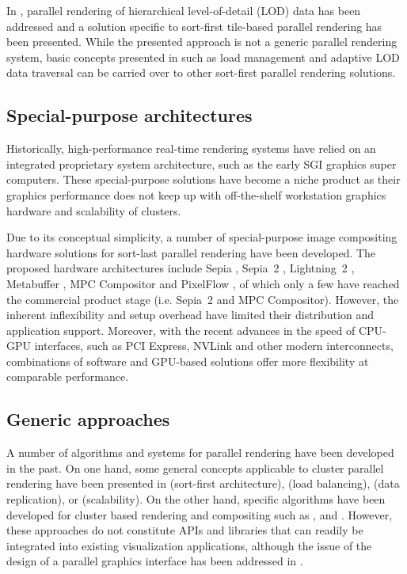 In \cite{NC:07}, parallel rendering of hierarchical level-of-detail (LOD) data
has been addressed and a solution specific to sort-first tile-based parallel
rendering has been presented. While the presented approach is not a generic
parallel rendering system, basic concepts presented in \cite{NC:07} such as load
management and adaptive LOD data traversal can be carried over to other
sort-first parallel rendering solutions.

\subsection{Special-purpose architectures}

Historically, high-performance real-time rendering systems have relied on an
integrated proprietary system architecture, such as the early SGI graphics super
computers. These special-purpose solutions have become a niche product as their
graphics performance does not keep up with off-the-shelf workstation graphics
hardware and scalability of clusters.

Due to its conceptual simplicity, a number of special-purpose image compositing
hardware solutions for sort-last parallel rendering have been developed. The
proposed hardware architectures include Sepia \cite {MHS:99a,sepia}, Sepia~2
\cite{LMSBHa:01,LMSBH:01}, Lightning~2 \cite{Stoll01}, Metabuffer
\cite{Blanke00,Zhang01}, MPC Compositor \cite{Muraki01} and PixelFlow
\cite{Molnar92,Eyles97}, of which only a few have reached the commercial
product stage (i.e. Sepia~2 and MPC Compositor). However, the inherent
inflexibility and setup overhead have limited their distribution and application
support. Moreover, with the recent advances in the speed of CPU-GPU interfaces,
such as PCI Express, NVLink and other modern interconnects, combinations of
software and GPU-based solutions offer more flexibility at comparable
performance.

\subsection{Generic approaches}

A number of algorithms and systems for parallel rendering have been developed in
the past. On one hand, some general concepts applicable to cluster parallel
rendering have been presented in \cite{Mueller:95,Mueller:97} (sort-first
architecture), \cite{SZFLS:99,SFLS:00} (load balancing), \cite{SFL:01} (data
replication), or \cite{CMF:05,CM:06} (scalability). On the other hand, specific
algorithms have been developed for cluster based rendering and compositing such
as \cite{AP:98}, \cite{CKS:02} and \cite{YYC:01,SMLAP:03}. However, these
approaches do not constitute APIs and libraries that can readily be integrated
into existing visualization applications, although the issue of the design of a
parallel graphics interface has been addressed in \cite{Igehy98}.

